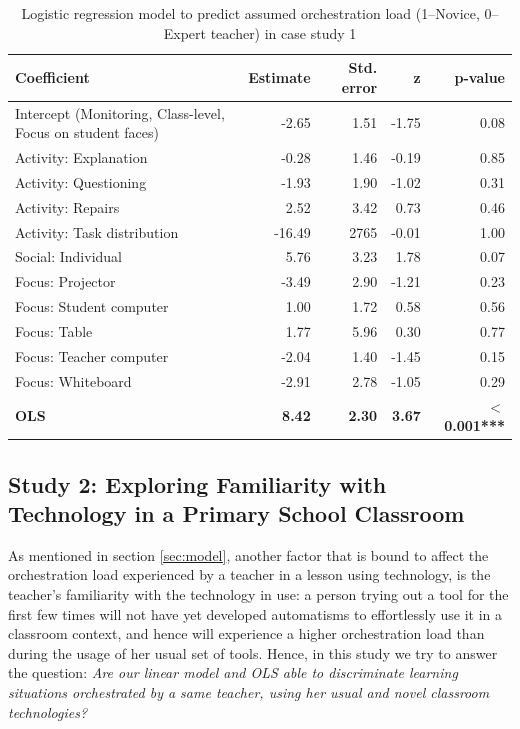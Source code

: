 \documentclass[10pt,journal,compsoc]{IEEEtran}
\begin{document}
\begin{table}[!t]
\caption{Logistic regression model to predict assumed orchestration load (1--Novice, 0--Expert teacher) in case study 1}
\label{tab:case1results}
\centering
\begin{tabular}{|p{2.8cm}||r|r|r|r|}
\hline
Coefficient & Estimate & Std. error & z & p-value\\
\hline
\hline
Intercept (Monitoring, Class-level, Focus on student faces) & -2.65 & 1.51 & -1.75 & 0.08 \\
Activity: Explanation & -0.28 & 1.46 & -0.19 & 0.85 \\
Activity: Questioning & -1.93 & 1.90 & -1.02 & 0.31 \\
Activity: Repairs & 2.52 & 3.42 & 0.73 & 0.46 \\
Activity: Task distribution & -16.49 & 2765 & -0.01 & 1.00 \\
Social: Individual & 5.76 & 3.23 & 1.78 & 0.07 \\
Focus: Projector & -3.49 & 2.90 & -1.21 & 0.23 \\
Focus: Student computer & 1.00 & 1.72 & 0.58 & 0.56 \\
Focus: Table & 1.77 & 5.96 & 0.30 & 0.77 \\
Focus: Teacher computer & -2.04 & 1.40 & -1.45 & 0.15 \\
Focus: Whiteboard & -2.91 & 2.78 & -1.05 & 0.29 \\
\textbf{OLS} & \textbf{8.42} & \textbf{2.30} & \textbf{3.67} & \textbf{$<$0.001***} \\
\hline
\end{tabular}
\end{table}


\subsection{Study 2: Exploring Familiarity with Technology in a Primary School Classroom}
\label{sec:study2}

As mentioned in section \ref{sec:model}, another factor that is bound to affect the orchestration load experienced by a teacher in a lesson using technology, is the teacher's familiarity with the technology in use: a person trying out a tool for the first few times will not have yet developed automatisms to effortlessly use it in a classroom context, and hence will experience a higher orchestration load than during the usage of her usual set of tools. Hence, in this study we try to answer the question: \textit{Are our linear model and OLS able to discriminate learning situations orchestrated by a same teacher, using her usual and novel classroom technologies?}
\end{document}
